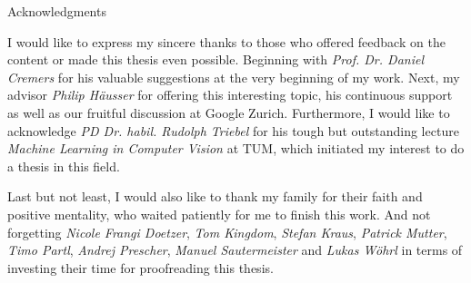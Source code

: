\thispagestyle{empty}

\vspace*{20mm}

\begin{center}
{ Acknowledgments}
\end{center}

\vspace{10mm}

I would like to express my sincere thanks to those who offered feedback on the content or made this thesis even possible. Beginning with \textit{Prof. Dr. Daniel Cremers} for his valuable suggestions at the very beginning of my work. Next, my advisor \textit{Philip Häusser} for offering this interesting topic, his continuous support as well as our fruitful discussion at Google Zurich. Furthermore, I would like to acknowledge \textit{PD Dr. habil. Rudolph Triebel} for his tough but outstanding lecture \textit{Machine Learning in Computer Vision} at TUM, which initiated my interest to do a thesis in this field.


Last but not least, I would also like to thank my family for their faith and positive mentality, who waited patiently for me to finish this work. And not forgetting \textit{Nicole Frangi Doetzer}, \textit{Tom Kingdom}, \textit{Stefan Kraus}, \textit{Patrick Mutter}, \textit{Timo Partl}, \textit{Andrej Prescher}, \textit{Manuel Sautermeister} and \textit{Lukas Wöhrl} in terms of investing their time for proofreading this thesis.

\cleardoublepage{}
